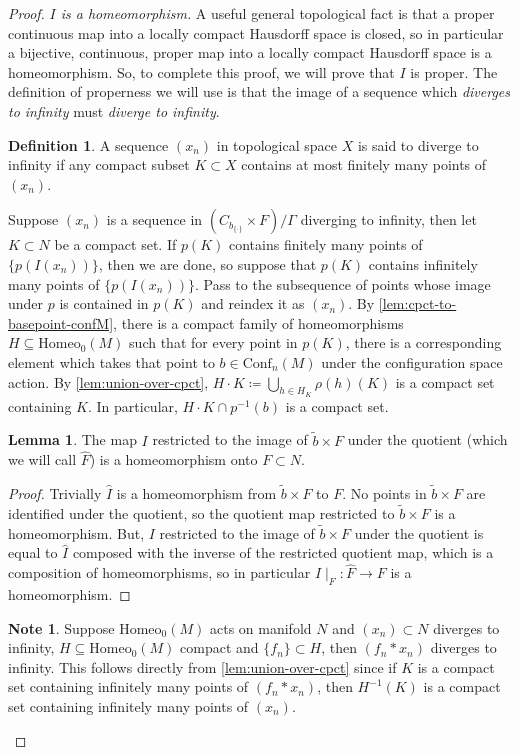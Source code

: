 \documentclass[10pt, oneside]{article}
\newcommand{\homeo}[1][S^1]{\text{Homeo}_0(#1)}
\newcommand{\conf}[2][S^1]{\text{Conf}_{#2}(#1)}
\newcommand{\set}{{\{\cdot\}}}
\newcommand{\maxcov}{C_{b_\set}}
\theoremstyle{definition}
\newtheorem{defn}{Definition}[section]
\newtheorem*{lem*}{Lemma}
\newtheorem*{note*}{Note}
\theoremstyle{definition}
\begin{document}
\begin{proof}
    \medskip
    {\it $I$ is a homeomorphism.} A useful general topological fact is that a proper continuous map into a locally compact Hausdorff space is closed, so in particular a bijective, continuous, proper map into a locally compact Hausdorff space is a homeomorphism. So, to complete this proof, we will prove that $I$ is proper. The definition of properness we will use is that the image of a sequence which {\it diverges to infinity} must {\it diverge to infinity}.
    \begin{defn}
        A sequence $(x_n)$ in topological space $X$ is said to diverge to infinity if any compact subset $K\subset X$ contains at most finitely many points of $(x_n)$.
    \end{defn}
    Suppose $(x_n)$ is a sequence in $(\maxcov\times F)/\Gamma$ diverging to infinity, then let $K\subset N$ be a compact set. If $p(K)$ contains finitely many points of $\{p(I(x_n))\}$, then we are done, so suppose that $p(K)$ contains infinitely many points of $\{p(I(x_n))\}$. Pass to the subsequence of points whose image under $p$ is contained in $p(K)$ and reindex it as $(x_n)$. By \cref{lem:cpct-to-basepoint-confM}, there is a compact family of homeomorphisms $H\subseteq \homeo[M]$ such that for every point in $p(K)$, there is a corresponding element which takes that point to $b\in\conf[M]{n}$ under the configuration space action. By \cref{lem:union-over-cpct}, $H\cdot K\coloneqq \bigcup_{h\in H_K}\rho(h)(K)$ is a compact set containing $K$. In particular, $H\cdot K\cap p^{-1}(b)$ is a compact set.

    \begin{lem*}
        The map $I$ restricted to the image of $\tilde{b}\times F$ under the quotient (which we will call $\hat{F}$) is a homeomorphism onto $F\subset N$.
    \end{lem*}
    \begin{proof}
        Trivially $\hat{I}$ is a homeomorphism from $\tilde{b}\times F$ to $F$.
        No points in $\tilde{b}\times F$ are identified under the quotient, so the quotient map restricted to $\tilde{b}\times F$ is a homeomorphism.
        But, $I$ restricted to the image of $\tilde{b}\times F$ under the quotient is equal to
        $\hat{I}$ composed with the inverse of the restricted quotient map, which is a composition of homeomorphisms, so in particular
        $I\mid_{\hat{F}}: \hat{F} \to F$ is a homeomorphism.
    \end{proof}

    \begin{note*}
        Suppose $\homeo[M]$ acts on manifold $N$ and $(x_n)\subset N$ diverges to infinity, $H\subseteq\homeo[M]$ compact and $\{f_n\}\subset H$, then $(f_n*x_n)$ diverges to infinity. This follows directly from \cref{lem:union-over-cpct} since if $K$ is a compact set containing infinitely many points of $(f_n*x_n)$, then $H^{-1}(K)$ is a compact set containing infinitely many points of $(x_n)$.
    \end{note*}


\end{proof}
\end{document}
